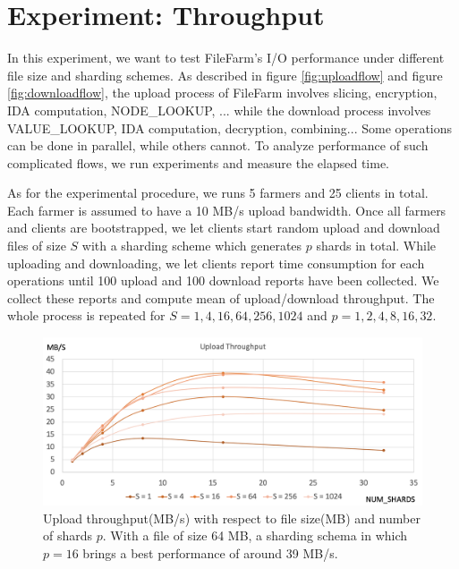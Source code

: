 \section{Experiment: Throughput}
\label{s:expthroughput}

In this experiment, we want to test FileFarm's I/O performance under different file size and sharding schemes. As described in figure \ref{fig:uploadflow} and figure \ref{fig:downloadflow}, the upload process of FileFarm involves slicing, encryption, IDA computation, NODE\_LOOKUP, ... while the download process involves VALUE\_LOOKUP, IDA computation, decryption, combining... Some operations can be done in parallel, while others cannot. To analyze performance of such complicated flows, we run experiments and measure the elapsed time.

As for the experimental procedure, we runs 5 farmers and 25 clients in total. Each farmer is assumed to have a 10 MB/s upload bandwidth. Once all farmers and clients are bootstrapped, we let clients start random upload and download files of size $S$ with a sharding scheme which generates $p$ shards in total. While uploading and downloading, we let clients report time consumption for each operations until 100 upload and 100 download reports have been collected. We collect these reports and compute mean of upload/download throughput. The whole process is repeated for $S=1,4,16,64,256,1024$ and $p=1,2,4,8,16,32$.

\begin{figure}[hbt]
\centering
  \includegraphics[width=14cm]{charts/chart_upload_throughput.png}
  \caption[Upload throughput with respect to file size and number of shards]{Upload throughput(MB/s) with respect to file size(MB) and number of shards $p$. With a file of size 64 MB, a sharding schema in which $p=16$ brings a best performance of around 39 MB/s.}
  \label{fig:uploadthroughput}
\end{figure}

